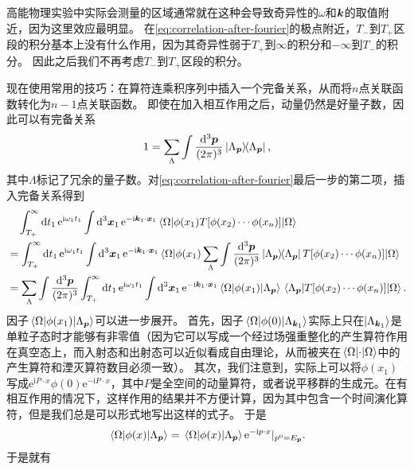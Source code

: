 \documentclass[hyperref, UTF8, a4paper]{ctexart}
\newcommand*{\ii}{\mathrm{i}}
\newcommand*{\ee}{\mathrm{e}}
\begin{document}
高能物理实验中实际会测量的区域通常就在这种会导致奇异性的$\omega$和$\vb*{k}$的取值附近，因为这里效应最明显。
在\eqref{eq:correlation-after-fourier}的极点附近，$T_-$到$T_+$区段的积分基本上没有什么作用，因为其奇异性弱于$T_+$到$\infty$的积分和$-\infty$到$T_-$的积分。
因此之后我们不再考虑$T_-$到$T_+$区段的积分。

现在使用常用的技巧：在算符连乘积序列中插入一个完备关系，从而将$n$点关联函数转化为$n-1$点关联函数。
即使在加入相互作用之后，动量仍然是好量子数，因此可以有完备关系
\[
    1 = \sum_{\Lambda} \int \frac{\dd[3]{\vb*{p}}}{(2\pi)^3} \dyad*{\Lambda_{\vb*{p}}}, 
\]
其中$\Lambda$标记了冗余的量子数。对\eqref{eq:correlation-after-fourier}最后一步的第二项，插入完备关系得到
\[
    \begin{aligned}
        &\quad \int_{T_+}^{\infty} \dd{t_1} \ee^{\ii \omega_1 t_1} \int \dd[3]{\vb*{x}_1} \ee^{- \ii \vb*{k}_1 \cdot \vb*{x}_1} \mel{\Omega}{\phi(x_1) T [\phi(x_2) \cdots \phi(x_n)]}{\Omega} \\
        &= \int_{T_+}^{\infty} \dd{t_1} \ee^{\ii \omega_1 t_1} \int \dd[3]{\vb*{x}_1} \ee^{- \ii \vb*{k}_1 \cdot \vb*{x}_1} \mel*{\Omega}{\phi(x_1) \sum_{\Lambda} \int \frac{\dd[3]{\vb*{p}}}{(2\pi)^3} \dyad*{\Lambda_{\vb*{p}}} T [\phi(x_2) \cdots \phi(x_n)]}{\Omega} \\
        &= \sum_{\Lambda} \int \frac{\dd[3]{\vb*{p}}}{(2\pi)^3} \int_{T_+}^{\infty} \dd{t_1} \ee^{\ii \omega_1 t_1} \int \dd[3]{\vb*{x}_1} \ee^{- \ii \vb*{k}_1 \cdot \vb*{x}_1} \mel*{\Omega}{\phi(x_1)}{\Lambda_{\vb*{p}}} \mel*{\Lambda_{\vb*{p}}}{T [\phi(x_2) \cdots \phi(x_n)]}{\Omega}.
    \end{aligned}
\]
因子$\mel*{\Omega}{\phi(x_1)}{\Lambda_{\vb*{p}}}$可以进一步展开。
首先，因子$\mel*{\Omega}{\phi(0)}{\Lambda_{\vb*{k}_1}}$实际上只在$\ket{\Lambda_{\vb*{k}_1}}$是单粒子态时才能够有非零值（因为它可以写成一个经过场强重整化的产生算符作用在真空态上，而入射态和出射态可以近似看成自由理论，从而被夹在$\mel*{\Omega}{\cdot}{\Omega}$中的产生算符和湮灭算符数目必须一致）。
其次，我们注意到，实际上可以将$\phi(x_1)$写成$\ee^{\ii P \cdot x} \phi(0) \ee^{- \ii P \cdot x}$，其中$P$是全空间的动量算符，或者说平移群的生成元。在有相互作用的情况下，这样作用的结果并不方便计算，因为其中包含一个时间演化算符，但是我们总是可以形式地写出这样的式子。
于是
\[
    \mel*{\Omega}{\phi(x)}{\Lambda_{\vb*{p}}} = \mel*{\Omega}{\phi(x)}{\Lambda_{\vb*{p}}} \ee^{- \ii p \cdot x} |_{p^0 = E_{\vb*{p}}}. 
\]
于是就有
\end{document}
